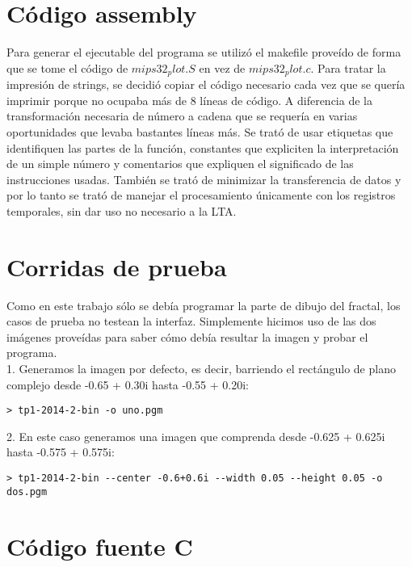\documentclass[a4paper,10pt]{article}
\begin{document}
\section{C\'odigo assembly}
Para generar el ejecutable del programa se utiliz\'o el makefile prove\'ido de forma que se tome 
el c\'odigo de $mips32_plot.S$ en vez de $mips32_plot.c$. 
Para tratar la impresi\'on de strings, se decidi\'o copiar el c\'odigo necesario cada vez que se quer\'ia 
imprimir porque no ocupaba m\'as de 8 l\'ineas de c\'odigo. A diferencia de la transformaci\'on 
necesaria de n\'umero a cadena que se requer\'ia en varias oportunidades que levaba bastantes l\'ineas m\'as. 
Se trat\'o de usar etiquetas que identifiquen las partes de la funci\'on, constantes que expliciten la interpretaci\'on de un simple n\'umero y comentarios que expliquen 
el significado de las instrucciones usadas.
Tambi\'en se trat\'o de minimizar la transferencia de datos y por lo tanto se trat\'o de manejar el 
procesamiento \'unicamente con los registros temporales, sin dar uso no necesario a la LTA. 


\pagebreak




\section{Corridas de prueba}

Como en este trabajo s\'olo se deb\'ia programar la parte de dibujo del fractal, los casos de prueba 
no testean la interfaz. Simplemente hicimos uso de las dos im\'agenes prove\'idas para saber c\'omo 
deb\'ia resultar la imagen y probar el programa.\\

1. Generamos la imagen por defecto, es decir, barriendo el rect\'angulo de plano complejo desde 
-0.65 + 0.30i hasta -0.55 + 0.20i:
\begin{verbatim}
> tp1-2014-2-bin -o uno.pgm
\end{verbatim}

2. En este caso generamos una imagen que comprenda desde -0.625 + 0.625i hasta -0.575 + 0.575i:
\begin{verbatim}
> tp1-2014-2-bin --center -0.6+0.6i --width 0.05 --height 0.05 -o dos.pgm
\end{verbatim}



\section{C\'odigo fuente C}
\end{document}
